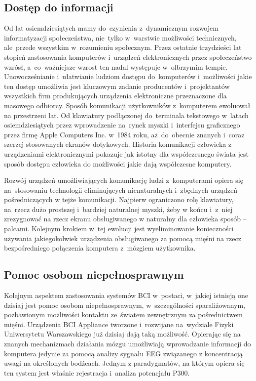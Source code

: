 \documentclass[licencjacka,openright]{pracamgr}
\begin{document}
\subsection{Dostęp do informacji}
Od lat osiemdziesiątych mamy do~czynienia z~dynamicznym rozwojem informatyzacji społeczeństwa, nie~tylko w~warstwie możliwości technicznych, ale~przede wszystkim w~rozumieniu społecznym. Przez ostatnie trzydzieści lat stopień zastosowania komputerów i~urządzeń elektronicznych przez społeczeństwo wzrósł, a~co~ważniejsze wzrost ten nadal występuje w~olbrzymim tempie. Unowocześnianie i~ułatwianie ludziom dostępu do~komputerów i~możliwości jakie ten dostęp umożliwia jest kluczowym zadanie producentów i~projektantów wszystkich firm produkujących urządzenia elektroniczne przeznaczone dla masowego odbiorcy. Sposób komunikacji użytkowników z~komputerem ewoluował na przestrzeni lat. Od klawiatury podłączonej do~terminala tekstowego w~latach osiemdziesiątych przez wprowadzenie na~rynek myszki i~interfejsu graficznego przez firmę Apple Computers Inc. w~1984 roku, aż~do~obecnie znanych i~coraz szerzej stosowanych ekranów dotykowych. Historia komunikacji człowieka z urządzeniami elektronicznymi pokazuje jak istotny dla współczesnego świata jest sposób dostępu człowieka do możliwości jakie dają współczesne komputery.

Rozwój urządzeń umożliwiających komunikację ludzi z~komputerami opiera się na~stosowaniu technologii eliminujących nienaturalnych i~zbędnych urządzeń pośredniczących w tejże komunikacji. Najpierw ograniczono rolę klawiatury, na~rzecz dużo prostszej i~bardziej naturalnej myszki, żeby w końcu i~z~niej zrezygnować na rzecz ekranu obsługiwanego w naturalny dla człowieka sposób -- palcami. Kolejnym krokiem w~tej ewolucji jest wyeliminowanie konieczności używania jakiegokolwiek urządzenia obsługiwanego za pomocą mięśni na rzecz bezpośredniego połączenia komputera z~mózgiem użytkownika.

\subsection{Pomoc osobom niepełnosprawnym}
Kolejnym aspektem zastosowania systemów BCI w~postaci, w~jakiej istnieją one dzisiaj jest pomoc osobom niepełnosprawnym, w~szczególności sparaliżowanym, pozbawionym możliwości kontaktu ze~światem zewnętrznym za pośrednictwem mięśni. Urządzenia BCI Appliance tworzone i~rozwijane na~wydziale Fizyki Uniwersytetu Warszawskiego już dzisiaj dają taką możliwość.
Opierając się na znanych mechanizmach działania mózgu umożliwiają wprowadzanie informacji do komputera jedynie za pomocą analizy sygnału EEG związanego z koncentracją uwagi na określonych bodźcach. Jednym z paradygmatów, na którym opiera się ten system jest właśnie rejestracja i~analiza potencjału P300.
\end{document}
